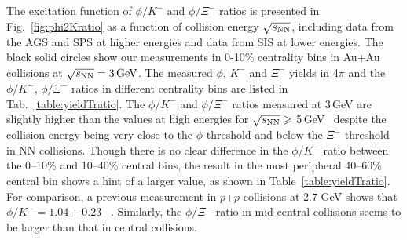 \documentclass[%
 reprint,	
showpacs,
 amsmath,amssymb,
 aps,
 prc,
]{revtex4-1}
\begin{document}
The excitation function of $\phi/K^-$ and $\phi/\Xi^-$ ratios is presented in Fig.~\ref{fig:phi2Kratio} as a function of collision energy $\sqrt{s_{\rm NN}}$, including data from the AGS and SPS at higher energies and data from SIS at lower energies. The black solid circles show our measurements in 0-10\% centrality bins in Au+Au collisions at ${\sqrt{s_{\rm NN}} = \rm{3\,GeV}}$. The measured $\phi$, $K^-$ and $\Xi^-$ yields in 4$\pi$ and the $\phi/K^-$, $\phi/\Xi^-$ ratios in different centrality bins are listed in Tab.~\ref{table:yieldTratio}. The $\phi/K^-$ and $\phi/\Xi^-$ ratios measured at 3\,GeV are %
slightly higher than the values at high energies for $\sqrt{s_{\rm NN}}\geqslant$ 5\,GeV~\cite{NA49_phi,NA49_piK,NA49_piK2,E917_phi,ALICE_phi_2p7TeV,STAR_phi_64a200GeV,Xi_ArKCl_HADES,star_bes_strangeness} despite the collision energy being very close to the $\phi$ threshold and below the $\Xi^-$ threshold in NN collisions. %
Though there is no clear difference in the $\phi/K^-$ ratio between the 0--10\% and 10--40\% central bins, the result in the most peripheral 40--60\% central bin shows a hint of a larger value, as shown in Table~\ref{table:yieldTratio}. For comparison, a previous measurement in $p$+$p$ collisions at 2.7 GeV shows that $\phi/K^- = 1.04\pm0.23$ ~\cite{ANKE_phi}. Similarly, the $\phi/\Xi^-$ ratio in mid-central collisions seems to be larger than that in central collisions.
\end{document}
